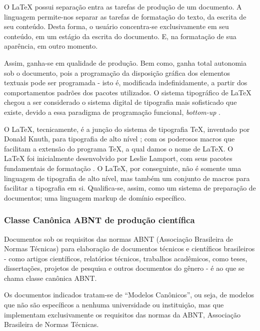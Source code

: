 \documentclass[
12pt,				%
openright,			%
oneside,			%
a4paper,			%
english,			%
french,				%
spanish,			%
brazil,				%
]{abntex2}
\begin{document}
O \LaTeX{} possui separação entra as tarefas de produção de um
documento. A linguagem permite-nos separar as tarefas de formatação do texto, da escrita de seu conteúdo. Desta forma, o usuário concentra-se
exclusivamente em seu conteúdo, em um estágio da escrita do documento. E, na formatação de sua aparência, em outro momento.

Assim, ganha-se em qualidade de produção. Bem como, ganha total autonomia sob o documento, pois a programação da disposição gráfica dos elementos textuais pode ser programada - isto é, modificada indefinidamente, a partir dos comportamentos padrões dos pacotes utilizados. O sistema tipográfico de \LaTeX{} chegou a ser considerado o sistema digital de
tipografia mais sofisticado que existe, devido a essa paradigma de
programação funcional, \textit{bottom-up} \cite{haralambous2007}.

O \LaTeX, tecnicamente, é a junção do sistema de tipografia \TeX,
inventado por Donald Knuth, para tipografia de alto nível
\cite{knuth1986}; com os poderosos macros que facilitam a extensão do programa \TeX, a qual damos o nome de
\LaTeX. O \LaTeX{} foi inicialmente desenvolvido por Leslie Lamport, com
seus pacotes fundamentais de formatação \cite{lamport1994}. O \LaTeX,
por conseguinte, não é somente uma linguagem de tipografia de alto
nível, mas também um conjunto de macros para facilitar a tipografia em
si. Qualifica-se, assim, como um sistema de preparação de documentos;
uma linguagem markup de domínio específico.

\subsubsection{Classe Canônica ABNT de produção científica}

Documentos sob os requisitos das normas ABNT (Associação Brasileira de Normas
Técnicas) para elaboração de documentos técnicos e científicos
brasileiros - como artigos científicos, relatórios técnicos, trabalhos
acadêmicos, como teses, dissertações, projetos de pesquisa e outros
documentos do gênero \cite{abntex2012} - é ao que se chama classe
canônica ABNT.

\begin{citacao}
  Os documentos indicados tratam-se de “Modelos Canônicos”, ou seja,
  de modelos que não são específicos a nenhuma universidade ou instituição, mas
  que implementam exclusivamente os requisitos das normas da ABNT, Associação
  Brasileira de Normas Técnicas. \cite[Cap. 1]{araujoclasse}
\end{citacao}
\end{document}
